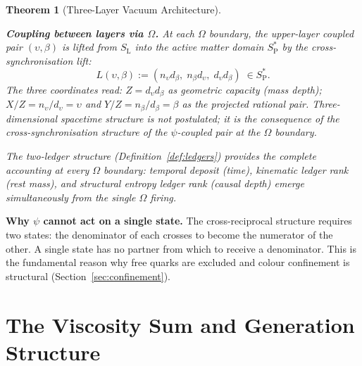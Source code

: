 \documentclass[11pt,letterpaper]{article}
\theoremstyle{plain}
\newtheorem{theorem}{Theorem}[section]
\theoremstyle{definition}
\theoremstyle{remark}
\newcommand{\SL}{S_{\mathrm{L}}}
\newcommand{\SPs}{S_{\mathrm{P}}^{*}}
\begin{document}
\begin{theorem}[Three-Layer Vacuum Architecture]
\begin{rsbox}
\medskip\noindent\textbf{Coupling between layers via $\Omega$.}
At each $\Omega$ boundary, the upper-layer coupled pair
$(\upsilon,\beta)$ is lifted from $\SL$ into the active matter domain
$\SPs$ by the cross-synchronisation lift:
\[
L(\upsilon,\beta):=(n_\upsilon d_\beta,\;n_\beta d_\upsilon,\;d_\upsilon d_\beta)
  \;\in\SPs.
\]
The three coordinates read: $Z=d_\upsilon d_\beta$ as geometric
capacity (mass depth); $X/Z=n_\upsilon/d_\upsilon=\upsilon$ and
$Y/Z=n_\beta/d_\beta=\beta$ as the projected rational pair.
Three-dimensional spacetime structure is not postulated; it is the
consequence of the cross-synchronisation structure of the $\psi$-coupled
pair at the $\Omega$ boundary.

The two-ledger structure (Definition~\ref{def:ledgers}) provides
the complete accounting at every $\Omega$ boundary: temporal deposit
(time), kinematic ledger rank (rest mass), and structural entropy
ledger rank (causal depth) emerge simultaneously from the single
$\Omega$ firing.
\end{rsbox}
\end{theorem}

\begin{observebox}
\textbf{Why $\psi$ cannot act on a single state.}  The cross-reciprocal
structure requires two states: the denominator of each crosses to become
the numerator of the other.  A single state has no partner from which to
receive a denominator.  This is the fundamental reason why free quarks
are excluded and colour confinement is structural (Section~\ref{sec:confinement}).
\end{observebox}


\section{The Viscosity Sum and Generation Structure}\label{sec:vs}
\end{document}
